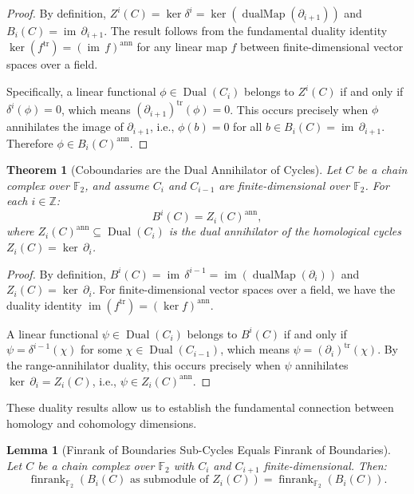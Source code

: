 \documentclass[11pt]{article}
\theoremstyle{plain}
\newtheorem*{theorem}{Theorem}
\newtheorem*{lemma}{Lemma}
\theoremstyle{definition}
\theoremstyle{remark}
\renewcommand{\ker}{\operatorname{ker}}
\begin{document}
\begin{proof}
By definition, $Z^i(C) = \ker \delta^i = \ker(\operatorname{dualMap}(\partial_{i+1}))$ and $B_i(C) = \operatorname{im}\,\partial_{i+1}$. The result follows from the fundamental duality identity $\ker(f^{\mathrm{tr}}) = (\operatorname{im}\,f)^{\mathrm{ann}}$ for any linear map $f$ between finite-dimensional vector spaces over a field.

Specifically, a linear functional $\phi \in \operatorname{Dual}(C_i)$ belongs to $Z^i(C)$ if and only if $\delta^i(\phi) = 0$, which means $(\partial_{i+1})^{\mathrm{tr}}(\phi) = 0$. This occurs precisely when $\phi$ annihilates the image of $\partial_{i+1}$, i.e., $\phi(b) = 0$ for all $b \in B_i(C) = \operatorname{im}\,\partial_{i+1}$. Therefore $\phi \in B_i(C)^{\mathrm{ann}}$.
\end{proof}

\begin{theorem}[Coboundaries are the Dual Annihilator of Cycles]
Let $C$ be a chain complex over $\mathbb{F}_2$, and assume $C_i$ and $C_{i-1}$ are finite-dimensional over $\mathbb{F}_2$. For each $i \in \mathbb{Z}$:
\[
  B^i(C) = Z_i(C)^{\mathrm{ann}},
\]
where $Z_i(C)^{\mathrm{ann}} \subseteq \operatorname{Dual}(C_i)$ is the dual annihilator of the homological cycles $Z_i(C) = \ker\,\partial_i$.
\end{theorem}

\begin{proof}
By definition, $B^i(C) = \operatorname{im}\,\delta^{i-1} = \operatorname{im}(\operatorname{dualMap}(\partial_i))$ and $Z_i(C) = \ker\,\partial_i$. For finite-dimensional vector spaces over a field, we have the duality identity $\operatorname{im}(f^{\mathrm{tr}}) = (\ker f)^{\mathrm{ann}}$.

A linear functional $\psi \in \operatorname{Dual}(C_i)$ belongs to $B^i(C)$ if and only if $\psi = \delta^{i-1}(\chi)$ for some $\chi \in \operatorname{Dual}(C_{i-1})$, which means $\psi = (\partial_i)^{\mathrm{tr}}(\chi)$. By the range-annihilator duality, this occurs precisely when $\psi$ annihilates $\ker\,\partial_i = Z_i(C)$, i.e., $\psi \in Z_i(C)^{\mathrm{ann}}$.
\end{proof}

These duality results allow us to establish the fundamental connection between homology and cohomology dimensions.

\begin{lemma}[Finrank of Boundaries Sub-Cycles Equals Finrank of Boundaries]
Let $C$ be a chain complex over $\mathbb{F}_2$ with $C_i$ and $C_{i+1}$ finite-dimensional. Then:
\[
  \operatorname{finrank}_{\mathbb{F}_2}(B_i(C) \text{ as submodule of } Z_i(C)) = \operatorname{finrank}_{\mathbb{F}_2}(B_i(C)).
\]
\end{lemma}
\end{document}

